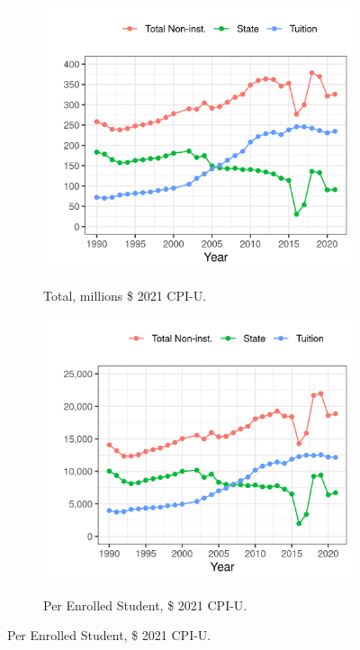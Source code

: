 \begin{figure}[h!]
    \centering
    \singlespacing
    \caption{Mean Revenues among Illinois Public Universities, by Year.}
    \begin{subfigure}[b]{0.495\textwidth}
        \centering
        \caption{Total, millions \$ 2021 CPI-U.}
        \includegraphics[width=\textwidth]{figures/illinois-funding-total.png}
        \label{fig:illinois-funding-total}
    \end{subfigure}
    \begin{subfigure}[b]{0.495\textwidth}
        \centering
        \caption{Per Enrolled Student, \$ 2021 CPI-U.}
        \includegraphics[width=\textwidth]{figures/illinois-funding-fte.png}
        \label{fig:illinois-funding-fte}
    \end{subfigure}
    \label{fig:illinois-funding}
\end{figure}

